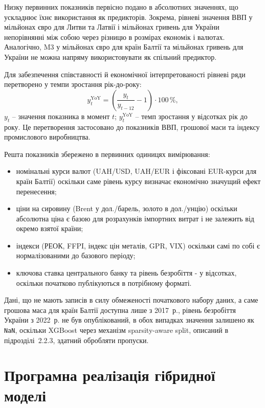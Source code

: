 \documentclass{bachelor_thesis}
\begin{document}
Низку первинних показників первісно подано в абсолютних значеннях, що ускладнює їхнє використання як предикторів. Зокрема, рівневі значення ВВП у мільйонах євро для Литви та Латвії і мільйонах гривень для України непорівнянні між собою через різницю в розмірах економік і валютах. Аналогічно, M3 у мільйонах євро для країн Балтії та мільйонах гривень для України не можна напряму використовувати як спільний предиктор.

Для забезпечення співставності й економічної інтерпретованості рівневі ряди перетворено у темпи зростання рік-до-року:
\begin{equation*}
y^{\text{YoY}}_t = \left(\frac{y_t}{y_{t-12}} - 1\right) \cdot 100\,\%,
\end{equation*}
 $y_t$ -- значення показника в момент $t$; $y^{\text{YoY}}_t$ -- темп зростання у відсотках рік до року. Це перетворення застосовано до показників ВВП, грошової маси та індексу промислового виробництва.

Решта показників збережено в первинних одиницях вимірювання:
\begin{itemize}
    \item номінальні курси валют (UAH/USD, UAH/EUR і фіксовані EUR-курси для країн Балтії) оскільки саме рівень курсу визначає економічно значущий ефект перенесення;
    \item ціни на сировину (Brent у дол./барель, золото в дол./унцію) оскільки абсолютна ціна є базою для розрахунків імпортних витрат і не залежить від окремо взятої країни;
    \item індекси (РЕОК, FFPI, індекс цін металів, GPR, VIX) оскільки самі по собі є нормалізованими до базового періоду;
    \item ключова ставка центрального банку та рівень безробіття - у відсотках, оскільки початково публікуються в потрібному форматі.
\end{itemize}

Дані, що не мають записів в силу обмеженості початкового набору даних, а саме грошова маса для країн Балтії доступна лише з 2017~р., рівень безробіття України з 2022~р. не був опублікований, в обох випадках значення залишено як \texttt{NaN}, оскільки XGBoost через механізм sparsity-aware split, описаний в підрозділі~2.2.3, здатний обробляти пропуски.

\section{Програмна реалізація гібридної моделі}
\end{document}
